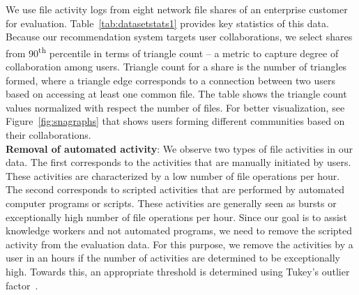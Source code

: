 We use file activity logs from eight network file shares of an
enterprise customer for evaluation.  Table~\ref{tab:datasetstats1}
provides key statistics of this data.  Because our recommendation
system targets user collaborations, we select shares from
90\textsuperscript{th} percentile in terms of triangle count -- a
metric to capture degree of collaboration among users.  Triangle count
for a share is the number of triangles formed, where a triangle edge
corresponds to a connection between two users based on accessing at
least one common file.  The table shows the triangle count values
normalized with respect the number of files.  For better
visualization, see Figure~\ref{fig:snagraphs} that shows users forming
different communities based on their collaborations. \\


\noindent\textbf{Removal of automated activity}: 
\label{sec:removebursts}
We observe two types of file activities in our data.  The first
corresponds to the activities that are manually initiated by
users. These activities are characterized by a low number of file
operations per hour.  The second corresponds to scripted activities
that are performed by automated computer programs or scripts.  These
activities are generally seen as bursts or exceptionally high number
of file operations per hour.  Since our goal is to assist knowledge
workers and not automated programs, we need to remove the scripted
activity from the evaluation data.  For this purpose, we remove
the activities by a user in an hours if the number of activities are 
determined to be exceptionally high. Towards this, an appropriate threshold 
is determined using Tukey's outlier
factor~\cite{wang2011statistical}.\linebreak

